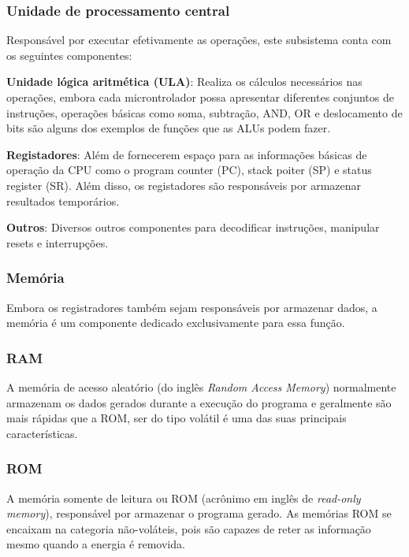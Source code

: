 \subsubsection{Unidade de processamento central}

Responsável por executar efetivamente as operações, este subsistema conta com os seguintes componentes:

\textbf{Unidade lógica aritmética (ULA)}: Realiza os cálculos necessários nas operações, embora cada microntrolador possa apresentar diferentes conjuntos de instruções, operações básicas como soma, subtração, AND, OR e deslocamento de bits são alguns dos exemplos de funções que as ALUs podem fazer.

\textbf{Registadores}: Além de fornecerem espaço para as informações básicas de operação da CPU como o program counter (PC), stack poiter (SP) e status register (SR). Além disso, os registadores são responsáveis por armazenar resultados temporários.

\textbf{Outros}: Diversos outros componentes para decodificar instruções, manipular resets e interrupções.

\subsubsection{Memória}

Embora os registradores também sejam responsáveis por armazenar dados, a memória é um componente dedicado exclusivamente para essa função.

\subsubsection*{RAM}

A memória de acesso aleatório (do inglês \textit{Random Access Memory}) normalmente armazenam os dados gerados durante a execução do programa e geralmente são mais rápidas que a ROM, ser do tipo volátil é uma das suas principais características.


\subsubsection*{ROM}

A memória somente de leitura ou ROM (acrônimo em inglês de \textit{read-only memory}), responsável por armazenar o programa gerado. As memórias ROM se encaixam na categoria não-voláteis, pois são capazes de reter as informação mesmo quando a energia é removida.

